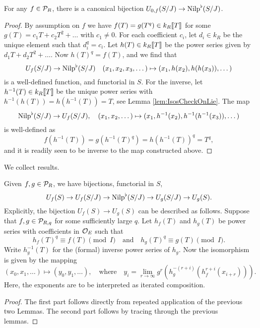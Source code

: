 \documentclass[../main.tex]{subfiles}
\begin{document}
\begin{lem}\label{lem:nilp0iso}
  For any $f \in \mathcal{P}_R$, there is a canonical bijection $U_{0,f}(S/J) \to
  {\mathrm{Nilp}}^\flat(S/J)$. 
\begin{proof}
  By assumption on $f$ we have $f(T) = g(T^{q}) \in k_R\llbracket T \rrbracket$ for some 
  $g(T) = c_1T + c_2T^2 + \dots$ with $c_1 \neq 0$. For each coefficient $c_i$, let
  $d_i \in k_R$ be the unique element such that $d_i^{q} = c_i$. Let
  $h(T) \in k_R\llbracket T \rrbracket$ be the power series given by $d_1 T + d_2
  T^2 + \dots$. Now $h(T)^{q}=f(T)$, and we find that 
  \begin{equation*}
      U_f(S/J) \to {\mathrm{Nilp}}^\flat(S/J) \quad
      (x_1, x_2, x_3, \dots) \mapsto (x_1, h(x_2), h(h(x_3)), \dots)
  \end{equation*}
  is a well-defined function, and functorial in $S$. For the
  inverse, let $h^{-1}(T) \in k_R\llbracket T \rrbracket$ be the unique power
  series with $h^{-1}(h(T))= h(h^{-1}(T)) = T$, see Lemma
  \ref{lem:IsosCheckOnLie}. The map
  \begin{equation*}
      {\mathrm{Nilp}}^\flat(S/J) \to U_f(S/J), \quad 
      (x_1, x_2, \dots ) \mapsto (x_1, h^{-1}(x_2), h^{-1}(h^{-1}(x_3)), \dots)
  \end{equation*}
  is well-defined as
  \begin{equation*}
      f(h^{-1}(T)) = g(h^{-1}(T)^{q}) = h(h^{-1}(T))^{q} =
      T^{q},
  \end{equation*}
  and it is readily seen to be inverse to the map constructed above.
\end{proof}
\end{lem}

We collect results.
\begin{prop}\label{prop:pHTcalc}
  Given $f,g \in \mathcal{P}_R$, we have bijections, functorial in $S$,
  \begin{equation} 
    U_f(S) \to U_f(S/J) \to {\mathrm{Nilp}}^\flat(S/J) \to U_g(S/J) \to U_g(S).
  \end{equation}
  Explicitly, the bijection $U_f(S) \to U_g(S)$ can be described as follows.
  Suppose that $f,g \in \mathcal{P}_{R,q}$ for some sufficiently large $q$. 
  Let $h_f(T)$ and $h_g(T)$ be power series with coefficients in ${\mathcal{O}_E}$ such that 
  $$h_f(T)^q \equiv f(T) \pmod I\quad\text{and}\quad h_g(T)^q \equiv g(T) \pmod
  I.$$
  Write $h_g^{-1}(T)$ for the (formal) inverse power series of $h_g$. 
  Now the isomorphism is given by the mapping
  \begin{equation*}
    (x_0, x_1, \dots) \mapsto (y_0, y_1, \dots), \quad \text{where} \quad y_i =
    \lim_{r \to \infty} g^r(h_g^{-(r+i)}(h_f^{r+i} (x_{i+r}))).
  \end{equation*}
  Here, the exponents are to be interpreted as iterated composition.
\begin{proof}
  The first part follows directly from repeated application of the previous
  two Lemmas. The second part follows by tracing through the previous lemmas.  
\end{proof}
\end{prop}
\end{document}
